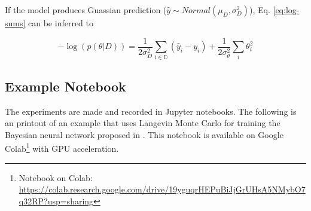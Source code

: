 \documentclass{article}
\begin{document}
If the model produces Guassian prediction ($\hat{y} \sim Normal(\mu_D, \sigma^{2}_{D})$), Eq. \ref{eq:log-sums} can be inferred to 

\begin{equation}
    -\log(p(\theta |D)) = \frac{1}{2\sigma^{2}_{D}} \sum_{i \in \mathbb{D}}(\hat{y}_i - y_i) + \frac{1}{2\sigma^{2}_{\theta}} \sum_{i}\theta_{i}^{2}
\end{equation}


\subsection{Example Notebook\label{sec:notebook}}

The experiments are made and recorded in Jupyter notebooks. The following is an printout of an example that uses Langevin Monte Carlo for training the Bayesian neural network proposed in \cite{chandra2021bayesian}. This notebook is available on Google Colab\footnote{Notebook on Colab: \url{https://colab.research.google.com/drive/19yguqrHEPuBiJjGrUHsA5NMybO7q32RP?usp=sharing}} with GPU acceleration.



\end{document}
